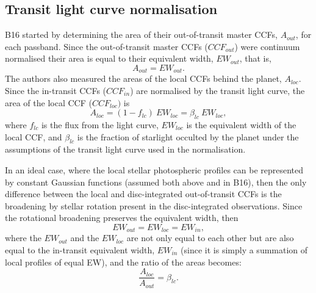 \documentclass{aa}
\begin{document}
\subsection{Transit light curve normalisation}
\label{subsec:tran}
B16 started by determining the area of their out-of-transit master CCFs, $A_{out}$, for each passband. Since the out-of-transit master CCFs ($CCF_{out}$) were continuum normalised their area is equal to their equivalent width, $EW_{out}$, that is,
\begin{equation}
\label{eqn:Ao}
A_{out} = EW_{out}.
\end{equation}  
The authors also measured the areas of the local CCFs behind the planet, $A_{loc}$. Since the in-transit CCFs ($CCF_{in}$) are normalised by the transit light curve, the area of the local CCF ($CCF_{loc})$ is
\begin{equation}
\label{eqn:Al}
A_{loc} = (1-f_{lc}) \ EW_{loc} = \beta_{lc} \ EW_{loc},
\end{equation}
where $f_{lc}$ is the flux from the light curve, $EW_{loc}$ is the equivalent width of the local CCF, and $\beta_{lc}$ is the fraction of starlight occulted by the planet under the assumptions of the transit light curve used in the normalisation. 

In an ideal case, where the local stellar photospheric profiles can be represented by constant Gaussian functions (assumed both above and in B16), then the only difference between the local and disc-integrated out-of-transit CCFs is the broadening by stellar rotation present in the disc-integrated observations. Since the rotational broadening preserves the equivalent width, then 
\begin{equation}
\label{eqn:ew}
EW_{out} = EW_{loc} = EW_{in},
\end{equation} 
where the $EW_{out}$ and the $EW_{loc}$ are not only equal to each other but are also equal to the in-transit equivalent width, $EW_{in}$ (since it is simply a summation of local profiles of equal EW), and the ratio of the areas becomes:
\begin{equation}
\label{eqn:Arat}
\frac{A_{loc}}{A_{out}} = \beta_{lc}.
\end{equation}
\end{document}

